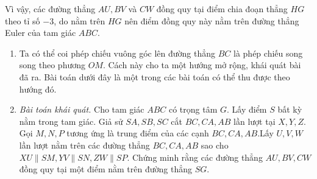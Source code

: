 \begin{bt}
{	Vì vậy, các đường thẳng $AU,BV$ và $CW$ đồng quy tại điểm chia đoạn thẳng $HG$ theo tỉ số $-3$, do nằm trên $HG$ nên điểm đồng quy này nằm trên đường thẳng Euler của tam giác $ABC$.
\begin{nx}\hfill
\begin{enumerate}
	\item Ta có thể coi phép chiếu vuông góc lên đường thẳng $BC$ là phép chiếu song song theo phương $OM$. Cách này cho ta một hướng mở rộng, khái quát bài đã ra. Bài toán dưới đây là một trong các bài toán có thể thu được theo hướng đó.\\
\item 	\textit{Bài toán khái quát.} Cho tam giác $ABC$ có trọng tâm $G$. Lấy điểm $S$ bất kỳ nằm trong tam giác. Giả sử $SA,SB,SC$ cắt $BC,CA,AB$ lần lượt tại $X,Y,Z$. Gọi $M,N,P$ tương ứng là trung điểm của các cạnh $BC,CA,AB$.Lấy $U,V,W$ lần lượt nằm trên các đường thẳng $BC,CA,AB$ sao cho $XU \parallel SM , YV \parallel SN, ZW \parallel SP$. Chứng minh rằng các đường thẳng $AU,BV,CW$ đồng quy tại một điểm nằm trên đường thẳng $SG$.
\end{enumerate}
\end{nx}
}
\end{bt}



